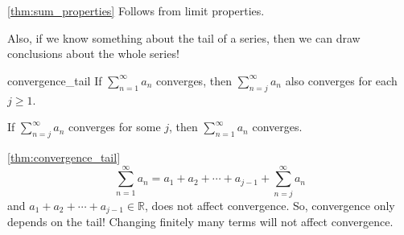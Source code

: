\begin{Proof}{\ref{thm:sum_properties}}{}
    Follows from limit properties.
\end{Proof}

Also, if we know something about the tail of a series, then we can draw conclusions about
the whole series!

\begin{Theorem}{}{convergence_tail}
    If $ \sum\limits_{n=1}^{\infty} a_n $ converges, then $ \sum\limits_{n=j}^{\infty} a_n $
    also converges for each $ j\geqslant 1 $.

    If $ \sum\limits_{n=j}^{\infty} a_n $ converges for some $ j $,
    then $ \sum\limits_{n=1}^{\infty} a_n $ converges.
\end{Theorem}

\begin{Proof}{\ref{thm:convergence_tail}}{}
    \[ \sum\limits_{n=1}^{\infty} a_n=a_1+a_2+\cdots+a_{j-1}+\sum\limits_{n=j}^{\infty} a_n \]
    and $ a_1+a_2+\cdots+a_{j-1}\in\mathbb{R} $, does not affect convergence.
    So, convergence only depends on the tail! Changing finitely many terms will not
    affect convergence.
\end{Proof}

